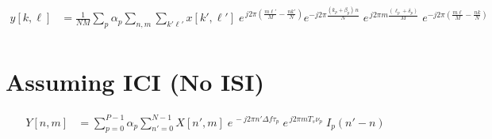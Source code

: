 \documentclass[12pt]{article}
\begin{document}
\begin{align}
  y[k,\ell]
  &=\frac{1}{NM}\sum_{p}\alpha_p
    \sum_{n,m}\sum_{k'\ell'}
    x[k',\ell']\;
    e^{\,j2\pi\!\left(\frac{m\ell'}{M}-\frac{nk'}{N}\right)}
    e^{-j2\pi\frac{(k_p+\beta_p)\,n}{N}}\;
    e^{\,j2\pi m\frac{(\ell_p+\delta_p)}{M}}\;
    e^{-j2\pi\!\left(\frac{m\ell}{M}-\frac{nk}{N}\right)}
  \nonumber\\[6pt]
\end{align}

\newpage
\section*{Assuming ICI (No ISI)}

\begin{align}
  Y[n,m]
  &= \sum_{p=0}^{P-1}\alpha_p
     \sum_{n'=0}^{N-1}
     X[n',m]\;
     e^{\,-j2\pi n'\Delta f\tau_p}\;
     e^{\,j2\pi m T_s\nu_p}\;
     I_p(n'-n)
\end{align}
\end{document}
